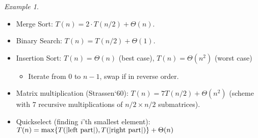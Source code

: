 \documentclass{article}
\theoremstyle{remark}
\newtheorem{example}{Example}
\begin{document}
\begin{example}
\begin{itemize}
\item Merge Sort: $T(n) = 2\cdot T(n/2)+\Theta (n)$.
\item Binary Search: $T(n)=T(n/2)+\Theta(1)$.
\item Insertion Sort: $T(n)=\Theta(n)$ (best case), $T(n)=\Theta(n^2)$ (worst case)
    \begin{itemize}
    \item Iterate from $0$ to $n-1$, swap if in reverse order.
    \end{itemize}
\item Matrix multiplication (Strassen`60): $T(n)=7T(n/2)+\Theta(n^2)$ (scheme with 7 recursive multiplications of $n/2\times n/2$ submatrices).
\item Quickselect (finding $i$'th smallest element): $T(n)=\max\{T(\vert \text{left part}\vert),\\ T(\vert\text{right part}\vert)\}+\Theta(n)$


\end{itemize}
\end{example}
\end{document}
